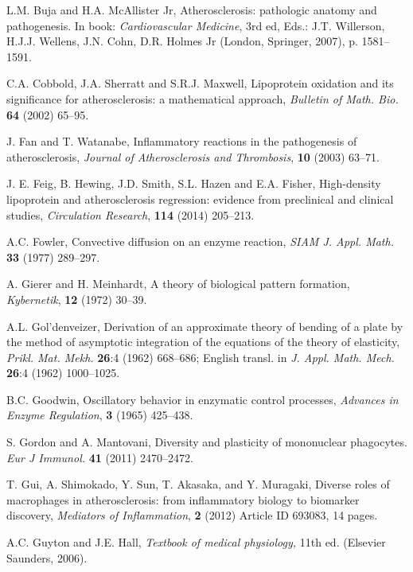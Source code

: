 \documentclass[reqno]{amsart}            %
\numberwithin{equation}{section}
\begin{document}
\begin{thebibliography}{99}
L.M. Buja and H.A. McAllister Jr, Atherosclerosis: pathologic anatomy and pathogenesis. In book:
{\it Cardiovascular Medicine}, 3rd ed, Eds.: J.T. Willerson, H.J.J. Wellens,  J.N. Cohn, D.R. Holmes Jr (London, Springer, 2007), p. 1581--1591.

C.A. Cobbold, J.A. Sherratt and S.R.J. Maxwell, Lipoprotein oxidation and its significance for atherosclerosis: a mathematical approach,
{\it Bulletin of Math. Bio.} {\bf 64} (2002) 65--95.


J. Fan and T. Watanabe, Inflammatory reactions in the pathogenesis of atherosclerosis, {\it Journal of Atherosclerosis and
Thrombosis}, {\bf 10}  (2003) 63--71.

J. E. Feig, B. Hewing, J.D. Smith, S.L. Hazen and  E.A. Fisher,
High-density lipoprotein and atherosclerosis regression:
evidence from preclinical and clinical studies, {\it Circulation Research},
{\bf 114} (2014) 205--213.

A.C. Fowler, Convective diffusion on an enzyme reaction, {\it SIAM J. Appl. Math.} {\bf 33} (1977) 289--297.

A. Gierer and H. Meinhardt,  A theory of biological pattern formation, {\it Kybernetik}, {\bf 12} (1972) 30--39.

A.L. Gol’denveizer, Derivation of an approximate theory of bending of a plate by
the method of asymptotic integration of the equations of the theory of elasticity,
{\it Prikl. Mat. Mekh.} {\bf 26}:4 (1962) 668--686; English transl. in {\it J. Appl. Math. Mech.}
{\bf 26}:4 (1962) 1000--1025.

B.C. Goodwin,  Oscillatory behavior in enzymatic control processes, {\it Advances in
Enzyme Regulation}, {\bf 3} (1965) 425--438.

S. Gordon and A. Mantovani,  Diversity and plasticity of mononuclear phagocytes.
{\it Eur J Immunol.} {\bf 41} (2011) 2470--2472.

T. Gui, A. Shimokado, Y. Sun, T. Akasaka, and Y. Muragaki,  Diverse roles of macrophages in atherosclerosis: from
inflammatory biology to biomarker discovery, {\it  Mediators of Inflammation}, {\bf 2} (2012) Article ID 693083, 14 pages.

A.C. Guyton and J.E. Hall, {\it Textbook of medical physiology,} 11th ed. (Elsevier Saunders, 2006).



\end{thebibliography}
\end{document}

